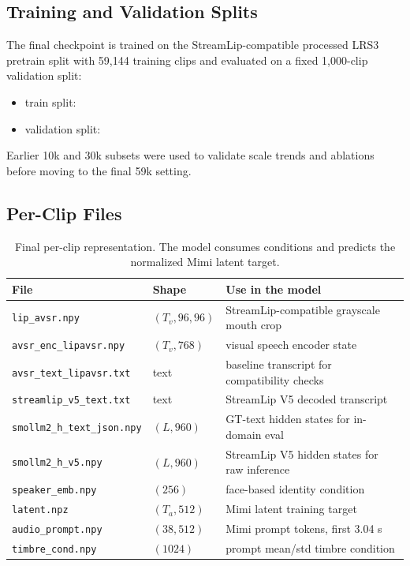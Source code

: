 \documentclass{article}
\begin{document}
\subsection{Training and Validation Splits}

The final checkpoint is trained on the StreamLip-compatible processed LRS3~\cite{afouras2018lrs3} pretrain split with
59,144 training clips and evaluated on a fixed 1,000-clip validation split:
\begin{itemize}
    \item train split:
    \item validation split:
\end{itemize}
Earlier 10k and 30k subsets were used to validate scale trends and ablations
before moving to the final 59k setting.

\subsection{Per-Clip Files}

\begin{table}[h]
\centering
\small
\begin{tabular}{@{}lll@{}}
\toprule
\textbf{File} & \textbf{Shape} & \textbf{Use in the model} \\
\midrule
\texttt{lip\_avsr.npy} & $(T_v,96,96)$ & StreamLip-compatible grayscale mouth crop \\
\texttt{avsr\_enc\_lipavsr.npy} & $(T_v,768)$ & visual speech encoder state \\
\texttt{avsr\_text\_lipavsr.txt} & text & baseline transcript for compatibility checks \\
\texttt{streamlip\_v5\_text.txt} & text & StreamLip V5 decoded transcript \\
\texttt{smollm2\_h\_text\_json.npy} & $(L,960)$ & GT-text hidden states for in-domain eval \\
\texttt{smollm2\_h\_v5.npy} & $(L,960)$ & StreamLip V5 hidden states for raw inference \\
\texttt{speaker\_emb.npy} & $(256)$ & face-based identity condition \\
\texttt{latent.npz} & $(T_a,512)$ & Mimi latent training target \\
\texttt{audio\_prompt.npy} & $(38,512)$ & Mimi prompt tokens, first 3.04 s \\
\texttt{timbre\_cond.npy} & $(1024)$ & prompt mean/std timbre condition \\
\bottomrule
\end{tabular}
\caption{Final per-clip representation. The model consumes conditions and
predicts the normalized Mimi latent target.}
\label{tab:data_files}
\end{table}
\end{document}
